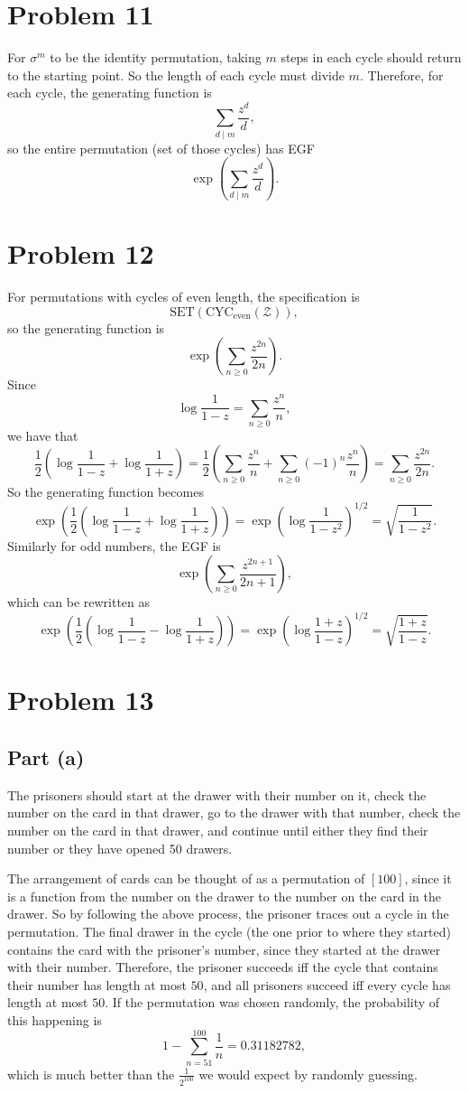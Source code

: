 \documentclass{article}
\newcommand{\mcZ}{\mathcal{Z}}
\newcommand{\set}{\mathrm{SET}}
\newcommand{\cyc}{\mathrm{CYC}}
\newcommand{\bigp}[1]{\left(#1\right)}
\begin{document}
\section*{Problem 11}
For $\sigma^m$ to be the identity permutation, taking $m$ steps in each cycle should return to the starting point. So the length of each cycle must divide $m$. Therefore, for each cycle, the generating function is
\[
    \sum_{d \mid m} \frac{z^d}{d},
\]
so the entire permutation (set of those cycles) has EGF
\[
    \exp\bigp{\sum_{d \mid m} \frac{z^d}{d}}.
\]

\section*{Problem 12}
For permutations with cycles of even length, the specification is
\[
    \set(\cyc_\text{even}(\mcZ)),
\]
so the generating function is
\[
    \exp\bigp{\sum_{n \ge 0} \frac{z^{2n}}{2n}}.
\]
Since
\[
    \log \frac{1}{1 - z} = \sum_{n \ge 0} \frac{z^n}{n},
\]
we have that
\[
    \frac{1}{2} \bigp{\log \frac{1}{1 - z} + \log \frac{1}{1 + z}} = \frac{1}{2} \bigp{\sum_{n \ge 0} \frac{z^n}{n} + \sum_{n \ge 0} (-1)^n \frac{z^n}{n}} = \sum_{n \ge 0} \frac{z^{2n}}{2n}.
\]
So the generating function becomes
\[
    \exp\bigp{\frac{1}{2} \bigp{\log \frac{1}{1 - z} + \log \frac{1}{1 + z}}} = \exp\bigp{\log \frac{1}{1 - z^2}}^{1/2} = \sqrt{\frac{1}{1 - z^2}}.
\]
Similarly for odd numbers, the EGF is
\[
    \exp\bigp{\sum_{n \ge 0} \frac{z^{2n + 1}}{2n + 1}},
\]
which can be rewritten as
\[
    \exp\bigp{\frac{1}{2} \bigp{\log \frac{1}{1 - z} - \log \frac{1}{1 + z}}} = \exp\bigp{\log \frac{1 + z}{1 - z}}^{1/2} = \sqrt{\frac{1 + z}{1 - z}}.
\]

\section*{Problem 13}
\subsection*{Part (a)}
The prisoners should start at the drawer with their number on it, check the number on the card in that drawer, go to the drawer with that number, check the number on the card in that drawer, and continue until either they find their number or they have opened 50 drawers.

The arrangement of cards can be thought of as a permutation of $[100]$, since it is a function from the number on the drawer to the number on the card in the drawer. So by following the above process, the prisoner traces out a cycle in the permutation. The final drawer in the cycle (the one prior to where they started) contains the card with the prisoner's number, since they started at the drawer with their number. Therefore, the prisoner succeeds iff the cycle that contains their number has length at most $50$, and all prisoners succeed iff every cycle has length at most $50$. If the permutation was chosen randomly, the probability of this happening is
\[
    1 - \sum_{n = 51}^{100} \frac{1}{n} = 0.31182782,
\]
which is much better than the $\frac{1}{2^{100}}$ we would expect by randomly guessing.
\end{document}
